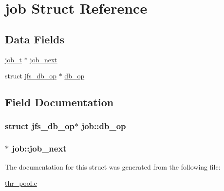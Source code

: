 \hypertarget{structjob}{
\section{job Struct Reference}
\label{structjob}
}
\subsection*{Data Fields}
\begin{DoxyCompactItemize}
\item 
\hyperlink{structjob}{job\_\-t} $\ast$ \hyperlink{structjob_a2a08b449eeaf0232cdf63cdd11512455}{job\_\-next}
\item 
struct \hyperlink{structjfs__db__op}{jfs\_\-db\_\-op} $\ast$ \hyperlink{structjob_accf991ef7ec77ef1b3dff6a9d8e16b41}{db\_\-op}
\end{DoxyCompactItemize}


\subsection{Field Documentation}
\hypertarget{structjob_accf991ef7ec77ef1b3dff6a9d8e16b41}{
\subsubsection[{db\_\-op}]{\setlength{\rightskip}{0pt plus 5cm}struct {\bf jfs\_\-db\_\-op}$\ast$ {\bf job::db\_\-op}}}
\label{structjob_accf991ef7ec77ef1b3dff6a9d8e16b41}
\hypertarget{structjob_a2a08b449eeaf0232cdf63cdd11512455}{
\subsubsection[{job\_\-next}]{$\ast$ {\bf job::job\_\-next}}}
\label{structjob_a2a08b449eeaf0232cdf63cdd11512455}


The documentation for this struct was generated from the following file:\begin{DoxyCompactItemize}
\item 
\hyperlink{thr__pool_8c}{thr\_\-pool.c}\end{DoxyCompactItemize}
